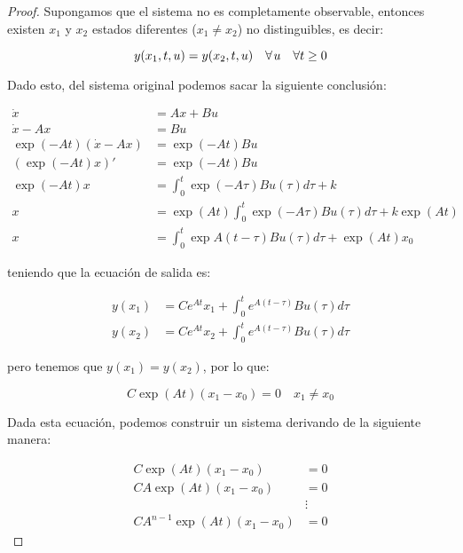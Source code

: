 		\begin{proof}
			Supongamos que el sistema no es completamente observable, entonces existen $x_1$ y $x_2$ estados diferentes ($x_1 \ne x_2$) no distinguibles, es decir:

			\begin{equation*}
				y(x_1, t, u) = y(x_2, t, u) \quad \forall \mkern2mu u \quad \forall t \geq 0
			\end{equation*}

			Dado esto, del sistema original podemos sacar la siguiente conclusión:

			\begin{align*}
				\dot{x} &= A x + B u \\
				\dot{x} - A x &= B u \\
				\exp{(-A t)} (\dot{x} - A x) &= \exp{(-A t)} B u \\
				(\exp{(-A t)} x)' &= \exp{(-A t)} B u \\
				\exp{(-A t)} x &= \int_0^t \exp{(-A \tau)} B u(\tau) d\tau + k \\
				x &= \exp{(A t)} \int_0^t \exp{(-A \tau)} B u(\tau) d\tau + k \exp{(A t)}\\
				x &= \int_0^t \exp{A(t - \tau)} B u(\tau) d\tau + \exp{(At)}x_0
			\end{align*}

			teniendo que la ecuación de salida es:

			\begin{align*}
				y(x_1) &= C e^{A t} x_1 + \int_0^t e^{A(t - \tau)} B u(\tau) d\tau \\
				y(x_2) &= C e^{A t} x_2 + \int_0^t e^{A(t - \tau)} B u(\tau) d\tau
			\end{align*}

			pero tenemos que $y(x_1) = y(x_2)$, por lo que:

			\begin{equation*}
				C \exp{(A t)} (x_1 - x_0) = 0 \quad x_1 \ne x_0
			\end{equation*}

			Dada esta ecuación, podemos construir un sistema derivando de la siguiente manera:

			\begin{align*}
				C \exp{(A t)} (x_1 - x_0) &= 0 \\
				C A \exp{(A t)} (x_1 - x_0) &= 0 \\
				&\vdots \\
				C A^{n-1} \exp{(A t)} (x_1 - x_0) &= 0
			\end{align*}


\end{proof}
